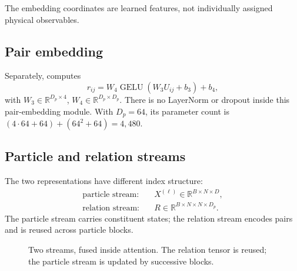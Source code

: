 \documentclass[11pt,a4paper]{article}
\newcommand{\R}{\mathbb R}
\newcommand{\GELU}{\operatorname{GELU}}
\newcommand{\code}[1]{\texttt{\small\detokenize{#1}}}
\numberwithin{equation}{section}
\begin{document}
The embedding coordinates are learned features, not individually assigned
physical observables.

\subsection{Pair embedding}
Separately, \code{PairwiseEmbedding} computes
\begin{equation}\label{eq:pairembed}
 r_{ij}=W_4\GELU(W_3U_{ij}+b_3)+b_4,
\end{equation}
with $W_3\in\R^{D_p\times4}$, $W_4\in\R^{D_p\times D_p}$.
There is no LayerNorm or dropout inside this pair-embedding module.
With $D_p=64$, its parameter count is
$(4\cdot64+64)+(64^2+64)=4{,}480$.

\subsection{Particle and relation streams}
The two representations have different index structure:
\begin{align}
 \text{particle stream:}\quad &X^{(\ell)}\in\R^{B\times N\times D},\\
 \text{relation stream:}\quad &R\in\R^{B\times N\times N\times D_p}.
\end{align}
The particle stream carries constituent states; the relation stream
encodes pairs and is reused across particle blocks.

\begin{figure}[ht]
\centering
{}
\caption{Two streams, fused inside attention. The relation tensor is reused;
the particle stream is updated by successive blocks.}
\end{figure}
\end{document}
